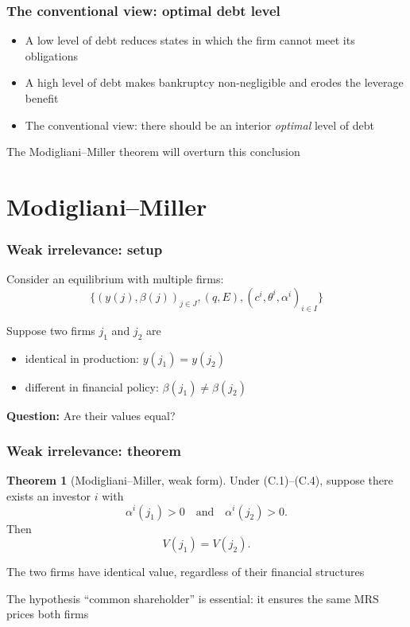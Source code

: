 \documentclass[blue]{beamer}
\def\et{\quad \textrm{and} \quad}
\theoremstyle{definition}
\theoremstyle{example}
\newtheorem*{theoremns}{Theorem}
\begin{document}
\begin{frame}\frametitle{The conventional view: optimal debt level}
\begin{itemize}
\item A low level of debt reduces states in which the firm cannot meet its obligations
\item A high level of debt makes bankruptcy non-negligible and erodes the leverage benefit
\item The conventional view: there should be an interior \emph{optimal} level of debt
\end{itemize}
\bigskip

The Modigliani--Miller theorem will overturn this conclusion
\end{frame}

\section{Modigliani--Miller}

\begin{frame}\frametitle{Weak irrelevance: setup}
Consider an equilibrium with multiple firms:
\begin{equation*}
\bigl\{ (y(j), \beta(j))_{j \in J}, (q, E), (c^i, \theta^i, \alpha^i)_{i \in I} \bigr\}
\end{equation*}
\bigskip

Suppose two firms $j_1$ and $j_2$ are
\begin{itemize}
\item identical in production: $y(j_1) = y(j_2)$
\item different in financial policy: $\beta(j_1) \neq \beta(j_2)$
\end{itemize}
\bigskip

\textbf{Question:} Are their values equal?
\end{frame}

\begin{frame}\frametitle{Weak irrelevance: theorem}
\begin{theoremns}[Modigliani--Miller, weak form]
Under \textup{(C.1)--(C.4)}, suppose there exists an investor $i$ with
\begin{equation*}
\alpha^i(j_1) > 0 \et \alpha^i(j_2) > 0.
\end{equation*}
Then
\begin{equation*}
V(j_1) = V(j_2).
\end{equation*}
\end{theoremns}
\bigskip

The two firms have identical value, regardless of their financial structures
\bigskip

The hypothesis ``common shareholder'' is essential: it ensures the same MRS prices both firms
\end{frame}
\end{document}
